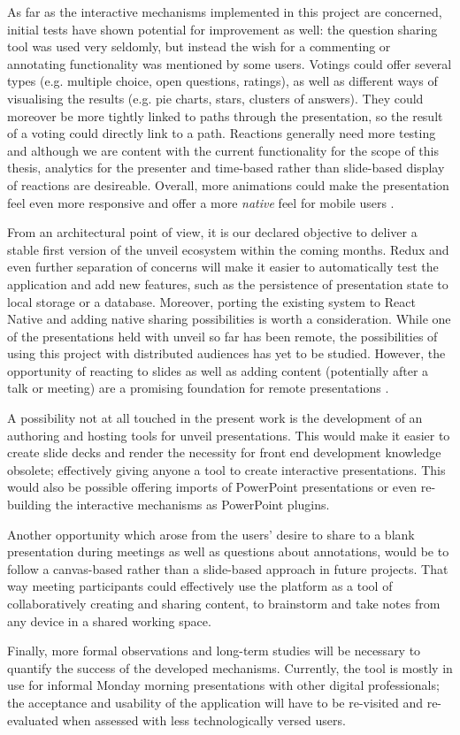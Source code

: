 As far as the interactive mechanisms implemented in this project are concerned, initial tests have shown potential for improvement as well: the question sharing tool was used very seldomly, but instead the wish for a commenting or annotating functionality was mentioned by some users. Votings could offer several types (e.g. multiple choice, open questions, ratings), as well as different ways of visualising the results (e.g. pie charts, stars, clusters of answers). They could moreover be more tightly linked to paths through the presentation, so the result of a voting could directly link to a path.
Reactions generally need more testing and although we are content with the current functionality for the scope of this thesis, analytics for the presenter and time-based rather than slide-based display of reactions are desireable.
Overall, more animations could make the presentation feel even more responsive and offer a more \emph{native} feel for mobile users \cite{GoogleMaterialDesignGuide}.

From an architectural point of view, it is our declared objective to deliver a stable first version of the unveil ecosystem within the coming months. Redux and even further separation of concerns will make it easier to automatically test the application and add new features, such as the persistence of presentation state to local storage or a database. Moreover, porting the existing system to React Native and adding native sharing possibilities is worth a consideration.
While one of the presentations held with unveil so far has been remote, the possibilities of using this project with distributed audiences has yet to be studied. However, the opportunity of reacting to slides as well as adding content (potentially after a talk or meeting) are a promising foundation for remote presentations \cite{Isaacs:InteractivePresentationsDistributedAudience, Cheng:TreebasedOnlinePresentations}.

A possibility not at all touched in the present work is the development of an authoring and hosting tools for unveil presentations. This would make it easier to create slide decks and render the necessity for front end development knowledge obsolete; effectively giving anyone a tool to create interactive presentations. This would also be possible offering imports of PowerPoint presentations or even re-building the interactive mechanisms as PowerPoint plugins.

Another opportunity which arose from the users' desire to share to a blank presentation during meetings as well as questions about annotations, would be to follow a canvas-based rather than a slide-based approach in future projects. That way meeting participants could effectively use the platform as a tool of collaboratively creating and sharing content, to brainstorm and take notes from any device in a shared working space.

Finally, more formal observations and long-term studies will be necessary to quantify the success of the developed mechanisms. Currently, the tool is mostly in use for informal Monday morning presentations with other digital professionals; the acceptance and usability of the application will have to be re-visited and re-evaluated when assessed with less technologically versed users.